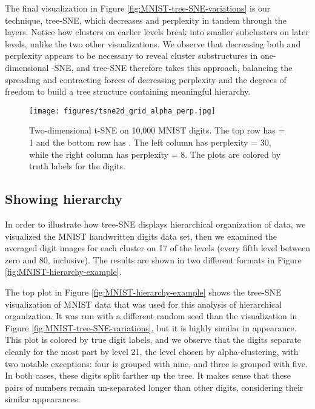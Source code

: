 \documentclass{article}
\begin{document}
The final visualization in Figure \ref{fig:MNIST-tree-SNE-variations} is our technique, tree-SNE, which decreases  and perplexity in tandem through the layers. Notice how clusters on earlier levels break into smaller subclusters on later levels, unlike the two other visualizations. We observe that decreasing both  and perplexity appears to be necessary to reveal cluster substructures in one-dimensional -SNE, and tree-SNE therefore takes this approach,  balancing the spreading and contracting forces of decreasing perplexity and the degrees of freedom to build a tree structure containing meaningful hierarchy.

\begin{figure}[htp]
    \centering
    \captionsetup{width=.9\linewidth}
    \texttt{[image: figures/tsne2d\_grid\_alpha\_perp.jpg]}
    \caption{Two-dimensional t-SNE on 10,000 MNIST digits. The top row has  = 1 and the bottom row has . The left column has perplexity = 30, while the right column has perplexity = 8. The plots are colored by truth labels for the digits.}
    \label{fig:MNIST-2d-t-SNE-variations}
\end{figure}

\subsection{Showing hierarchy} \label{sec:hierarchy}

In order to illustrate how tree-SNE displays hierarchical organization of data, we visualized the MNIST handwritten digits data set, then we examined the averaged digit images for each cluster on 17 of the levels (every fifth level between zero and 80, inclusive). The results are shown in two different formats in Figure \ref{fig:MNIST-hierarchy-example}. 

The top plot in Figure \ref{fig:MNIST-hierarchy-example} shows the tree-SNE visualization of MNIST data that was used for this analysis of hierarchical organization. It was run with a different random seed than the visualization in Figure \ref{fig:MNIST-tree-SNE-variations}, but it is highly similar in appearance. This plot is colored by true digit labels, and we observe that the digits separate cleanly for the most part by level 21, the level chosen by alpha-clustering, with two notable exceptions: four is grouped with nine, and three is grouped with five. In both cases, these digits split farther up the tree. It makes sense that these pairs of numbers remain un-separated longer than other digits, considering their similar appearances. 
\end{document}
